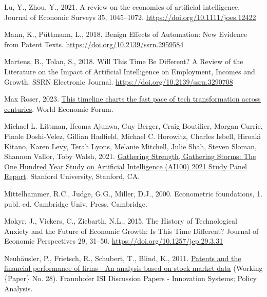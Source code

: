 \documentclass[
  12pt,
  a4paperpaper,
]{article}
\newlength{\cslhangindent}
\newenvironment{CSLReferences}[2] %
 {\begin{list}{}{%
  \setlength{\itemindent}{0pt}
  \setlength{\leftmargin}{0pt}
  \setlength{\parsep}{0pt}
  \ifodd #1
   \setlength{\leftmargin}{\cslhangindent}
   \setlength{\itemindent}{-1\cslhangindent}
  \fi
  \setlength{\itemsep}{#2\baselineskip}}}
 {\end{list}}
\begin{document}
\begin{CSLReferences}{1}{0}
Lu, Y., Zhou, Y., 2021. A review on the economics of artificial
intelligence. Journal of Economic Surveys 35, 1045--1072.
\url{https://doi.org/10.1111/joes.12422}

Mann, K., Püttmann, L., 2018. Benign {Effects} of {Automation}: {New}
{Evidence} from {Patent} {Texts}.
\url{https://doi.org/10.2139/ssrn.2959584}

Martens, B., Tolan, S., 2018. Will {This} {Time} {Be} {Different}? {A}
{Review} of the {Literature} on the {Impact} of {Artificial}
{Intelligence} on {Employment}, {Incomes} and {Growth}. SSRN Electronic
Journal. \url{https://doi.org/10.2139/ssrn.3290708}

Max Roser, 2023.
\href{https://www.weforum.org/agenda/2023/02/this-timeline-charts-the-fast-pace-of-tech-transformation-across-centuries/}{This
timeline charts the fast pace of tech transformation across centuries}.
World Economic Forum.

Michael L. Littman, Ifeoma Ajunwa, Guy Berger, Craig Boutilier, Morgan
Currie, Finale Doshi-Velez, Gillian Hadfield, Michael C. Horowitz,
Charles Isbell, Hiroaki Kitano, Karen Levy, Terah Lyons, Melanie
Mitchell, Julie Shah, Steven Sloman, Shannon Vallor, Toby Walsh, 2021.
\href{http://ai100.stanford.edu/2021-report}{Gathering {Strength},
{Gathering} {Storms}: {The} {One} {Hundred} {Year} {Study} on
{Artificial} {Intelligence} ({AI100}) 2021 {Study} {Panel} {Report}}.
Stanford University, Stanford, CA.

Mittelhammer, R.C., Judge, G.G., Miller, D.J., 2000. Econometric
foundations, 1. publ. ed. Cambridge Univ. Press, Cambridge.

Mokyr, J., Vickers, C., Ziebarth, N.L., 2015. The {History} of
{Technological} {Anxiety} and the {Future} of {Economic} {Growth}: {Is}
{This} {Time} {Different}? Journal of Economic Perspectives 29, 31--50.
\url{https://doi.org/10.1257/jep.29.3.31}

Neuhäusler, P., Frietsch, R., Schubert, T., Blind, K., 2011.
\href{https://www.econstor.eu/handle/10419/44995}{Patents and the
financial performance of firms - {An} analysis based on stock market
data} (Working \{Paper\} No. 28). Fraunhofer ISI Discussion Papers -
Innovation Systems; Policy Analysis.


\end{CSLReferences}
\end{document}
